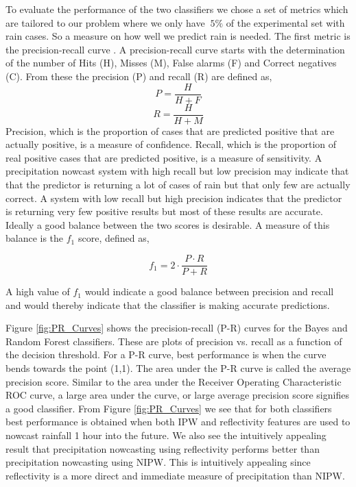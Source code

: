 \documentclass[proposal]{umassthesis}
\begin{document}
To evaluate the performance of the two classifiers we chose a set of metrics which are tailored to our problem where we only have $~5 \%$ of the experimental set with rain cases. So a measure on how well we predict rain is needed. The first metric is the precision-recall curve \cite{powers2011evaluation}. A precision-recall curve starts with the determination of the number of Hits (H), Misses (M), False alarms (F) and Correct negatives (C). From these the precision (P) and recall (R) are defined as,
\begin{equation}
P = \dfrac{H}{H + F}
\end{equation}
\begin{equation}
R = \dfrac{H}{H + M}
\end{equation}
Precision, which is the proportion of cases that are predicted positive that are actually positive, is a measure of confidence. Recall, which is the proportion of real positive cases that are predicted positive, is a measure of sensitivity. A precipitation nowcast system with high recall but low precision may indicate that that the predictor is returning a lot of cases of rain but that only few are actually correct. A system with low recall but high precision indicates that the predictor is returning very few positive results but most of these results are accurate. Ideally a good balance between the two scores is desirable. A measure of this balance is the $f_1$ score, defined as,

\begin{equation}
f_1 = 2 \cdot \dfrac{P \cdot R}{P + R}
\end{equation}

A high value of $f_1$ would indicate a good balance between precision and recall and would thereby indicate that the classifier is making accurate predictions.

Figure \ref{fig:PR_Curves} shows the precision-recall (P-R) curves for the Bayes and Random Forest classifiers. These are plots of precision vs. recall as a function of the decision threshold. For a P-R curve, best performance is when the curve bends towards the point (1,1). The area under the P-R curve is called the average precision score. Similar to the area under the Receiver Operating Characteristic ROC curve, a large area under the curve, or large average precision score signifies a good classifier. From Figure \ref{fig:PR_Curves} we see that for both classifiers best performance is obtained when both IPW and reflectivity features are used to nowcast rainfall 1 hour into the future. We also see the intuitively appealing result that precipitation nowcasting using reflectivity performs better than precipitation nowcasting using NIPW. This is intuitively appealing since reflectivity is a more direct and immediate measure of precipitation than NIPW. 
\end{document}
